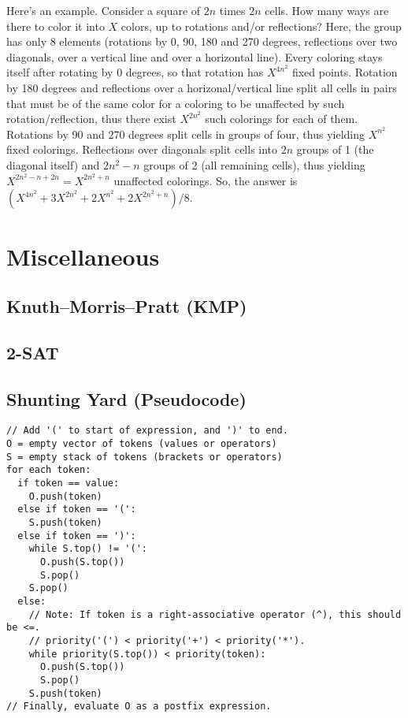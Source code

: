 \documentclass[10pt]{extarticle}
\begin{document}
\begin{multicols*}{3}
Here's an example. Consider a square of $2n$ times $2n$ cells. How many ways
are there to color it into $X$ colors, up to rotations and/or reflections?
Here, the group has only 8 elements (rotations by 0, 90, 180 and 270 degrees,
reflections over two diagonals, over a vertical line and over a horizontal
line). Every coloring stays itself after rotating by 0 degrees, so that
rotation has $X^{4n^2}$ fixed points. Rotation by 180 degrees and reflections
over a horizonal/vertical line split all cells in pairs that must be of the
same color for a coloring to be unaffected by such rotation/reflection, thus
there exist $X^{2n^2}$ such colorings for each of them. Rotations by 90 and 270
degrees split cells in groups of four, thus yielding $X^{n^2}$ fixed colorings.
Reflections over diagonals split cells into $2n$ groups of 1 (the diagonal
itself) and $2n^2-n$ groups of 2 (all remaining cells), thus yielding
$X^{2n^2-n+2n}=X^{2n^2+n}$ unaffected colorings.  So, the answer is
$(X^{4n^2}+3X^{2n^2}+2X^{n^2}+2X^{2n^2+n})/8$.


\section{Miscellaneous}

\subsection{Knuth--Morris--Pratt (KMP)} %


\subsection{2-SAT} %


\subsection{Shunting Yard (Pseudocode)} %
\begin{lstlisting}
// Add '(' to start of expression, and ')' to end.
O = empty vector of tokens (values or operators)
S = empty stack of tokens (brackets or operators)
for each token:
  if token == value:
    O.push(token)
  else if token == '(':
    S.push(token)
  else if token == ')':
    while S.top() != '(':
      O.push(S.top())
      S.pop()
    S.pop()
  else:
    // Note: If token is a right-associative operator (^), this should be <=.
	// priority('(') < priority('+') < priority('*').
    while priority(S.top()) < priority(token):
      O.push(S.top())
      S.pop()
    S.push(token)
// Finally, evaluate O as a postfix expression.
\end{lstlisting}


\end{multicols*}
\end{document}
